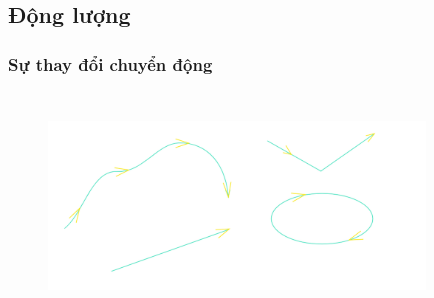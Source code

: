 \subsection{Động lượng}
\begin{frame}
\frametitle{Sự thay đổi chuyển động}
\begin{figure}
    \centering
    \includegraphics[width=10cm, height =6cm]{Slides/Figure/motionchange.png}
\end{figure}
\end{frame}
